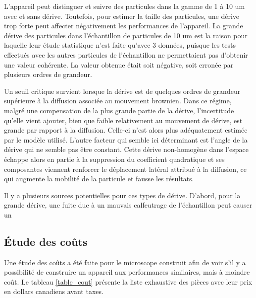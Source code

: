 \documentclass[11pt,letterpaper]{article}
\begin{document}
L'appareil peut distinguer et suivre des particules dans la gamme de 1 à 10 um avec et sans dérive.
Toutefois, pour estimer la taille des particules, une dérive trop forte peut affecter négativement 
les performances de l'appareil. La grande dérive des particules dans l'échantillon de particules 
de 10 um est la raison pour laquelle leur étude statistique n'est faite qu'avec 3 données, puisque 
les tests effectués avec les autres particules de l'échantillon ne permettaient pas d'obtenir une 
valeur cohérente. La valeur obtenue était soit négative, soit erronée par plusieurs ordres de grandeur.

Un seuil critique survient lorsque la dérive est de quelques ordres de grandeur supérieure à la 
diffusion associée au mouvement brownien. Dans ce régime, malgré une 
compensation de la plus grande partie de la dérive, l'incertitude qu'elle vient ajouter, bien que faible
relativement au mouvement de dérive, est grande par rapport à la diffusion. Celle-ci n'est alors plus 
adéquatement estimée par le modèle utilisé. L'autre facteur qui semble ici déterminant est l'angle de la
dérive qui ne semble pas être constant. Cette dérive non-homogène dans l'espace échappe alors en partie
à la suppression du coefficient quadratique et ses composantes viennent renforcer le déplacement latéral
attribué à la diffusion, ce qui augmente la mobilité de la particule et fausse les résultats. 

Il y a plusieurs sources potentielles pour ces types de dérive. D'abord, pour la grande dérive, une 
fuite due à un mauvais calfeutrage de l'échantillon peut causer un 




\subsection{Étude des coûts}

Une étude des coûts a été faite pour le microscope construit afin de voir s'il y a possibilité
de construire un appareil aux performances similaires, mais à moindre coût. Le tableau \ref{table_cout}
présente la liste exhaustive des pièces avec leur prix en dollars canadiens avant taxes.
\end{document}
